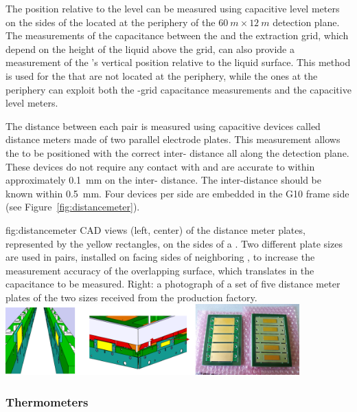 The position  relative to the  level can be measured using capacitive level meters on the sides of the  located at the periphery of the  $\SI{60}{m}\times\SI{12}{m}$ detection plane.  The  measurements of the capacitance between the  and the extraction grid, which depend on the height of the liquid above the grid, can also provide a  measurement  of the 's vertical position relative to the liquid surface. This method is used for the  that are not located at the periphery, while the ones at the periphery can exploit both the  -grid capacitance measurements and the capacitive level meters.
 
The distance between each  pair is measured using capacitive devices called distance meters made of two parallel electrode plates.  
This measurement allows the  to be positioned with the correct  inter- distance all along the detection plane. These devices do not require any contact with   and are accurate to within approximately \SI{0.1}{mm} on the  inter- distance. The  inter-distance should be known within \SI{0.5}{mm}.  Four devices per  side are embedded in the G10 frame side (see Figure~\ref{fig:distancemeter}).

\begin{dunefigure}{fig:distancemeter}
{CAD views (left, center) of the distance meter plates, represented by the yellow rectangles, on the sides of a . Two different plate sizes are used in pairs, installed on facing sides of neighboring , 
to increase the measurement accuracy of the overlapping surface, which translates in the capacitance to be measured. Right: a photograph of a set of five distance meter plates of the two sizes received from the production factory.}
\includegraphics[width=0.85\textwidth]{graphics/distancemeter}
\end{dunefigure}

\subsubsection{Thermometers}

